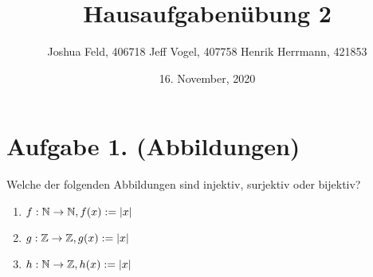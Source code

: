 \documentclass[german,12pt]{homework}
\title{Hausaufgabenübung 2}
\author{Joshua Feld, 406718 \quad Jeff Vogel, 407758 \quad Henrik Herrmann, 421853}
\date{16. November, 2020}
\institute{RWTH Aachen University\\Center for Computational Engineering Science}
\newcommand{\NN}{\mathbb{N}}
\newcommand{\ZZ}{\mathbb{Z}}
\DeclarePairedDelimiter{\absolute}{\lvert}{\rvert}
\DeclarePairedDelimiter{\enbrace}{(}{)}
\begin{document}
    \maketitle

    \section*{Aufgabe 1. (Abbildungen)}

    \begin{problem}
        Welche der folgenden Abbildungen sind injektiv, surjektiv oder bijektiv?
        \begin{enumerate}
            \item \(f: \NN \to \NN, f\enbrace*{x} := \absolute*{x}\)
            \item \(g: \ZZ \to \ZZ, g\enbrace*{x} := \absolute*{x}\)
            \item \(h: \NN \to \ZZ, h\enbrace*{x} := \absolute*{x}\)
        \end{enumerate}
    \end{problem}
\end{document}
